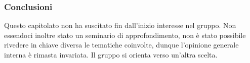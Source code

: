 \subsubsection{Conclusioni}

Questo capitolato non ha suscitato fin dall'inizio interesse nel gruppo. Non essendoci inoltre stato un seminario di approfondimento, non è stato possibile rivedere in chiave diversa le tematiche coinvolte, dunque l'opinione generale interna è rimasta invariata. Il gruppo si orienta verso un'altra scelta.




